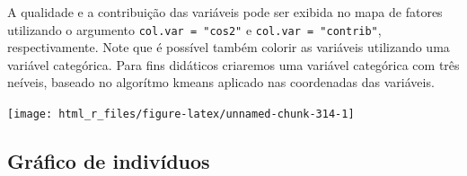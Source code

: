 \documentclass[
]{book}
\newenvironment{Shaded}{\begin{snugshade}}{\end{snugshade}}
\newcommand{\DataTypeTok}[1]{\textcolor[rgb]{0.13,0.29,0.53}{#1}}
\newcommand{\DecValTok}[1]{\textcolor[rgb]{0.00,0.00,0.81}{#1}}
\newcommand{\KeywordTok}[1]{\textcolor[rgb]{0.13,0.29,0.53}{\textbf{#1}}}
\newcommand{\NormalTok}[1]{#1}
\newcommand{\OperatorTok}[1]{\textcolor[rgb]{0.81,0.36,0.00}{\textbf{#1}}}
\newcommand{\OtherTok}[1]{\textcolor[rgb]{0.56,0.35,0.01}{#1}}
\newcommand{\StringTok}[1]{\textcolor[rgb]{0.31,0.60,0.02}{#1}}
\numberwithin{equation}{section}
\begin{document}
A qualidade e a contribuição das variáveis pode ser exibida no mapa de fatores utilizando o argumento \texttt{col.var\ =\ "cos2"} e \texttt{col.var\ =\ "contrib"}, respectivamente. Note que é possível também colorir as variáveis utilizando uma variável categórica. Para fins didáticos criaremos uma variável categórica com três neíveis, baseado no algorítmo kmeans aplicado nas coordenadas das variáveis.

\begin{Shaded}
\end{Shaded}

\begin{center}\texttt{[image: html\_r\_files/figure-latex/unnamed-chunk-314-1]} \end{center}

\hypertarget{gruxe1fico-de-indivuxedduos}{%
\subsection{Gráfico de indivíduos}\label{gruxe1fico-de-indivuxedduos}}
\end{document}
